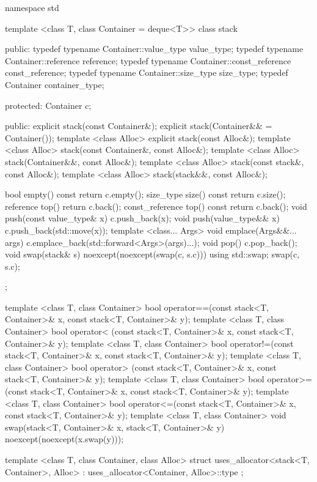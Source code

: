 \begin{codeblock}
namespace std {
  template <class T, class Container = deque<T>>
  class stack {
  public:
    typedef typename Container::value_type            value_type;
    typedef typename Container::reference             reference;
    typedef typename Container::const_reference       const_reference;
    typedef typename Container::size_type             size_type;
    typedef          Container                        container_type;

  protected:
    Container c;

  public:
    explicit stack(const Container&);
    explicit stack(Container&& = Container());
    template <class Alloc> explicit stack(const Alloc&);
    template <class Alloc> stack(const Container&, const Alloc&);
    template <class Alloc> stack(Container&&, const Alloc&);
    template <class Alloc> stack(const stack&, const Alloc&);
    template <class Alloc> stack(stack&&, const Alloc&);

    bool      empty() const             { return c.empty(); }
    size_type size()  const             { return c.size(); }
    reference         top()             { return c.back(); }
    const_reference   top() const       { return c.back(); }
    void push(const value_type& x)      { c.push_back(x); }
    void push(value_type&& x)           { c.push_back(std::move(x)); }
    template <class... Args>
      void emplace(Args&&... args)      { c.emplace_back(std::forward<Args>(args)...); }
    void pop()                          { c.pop_back(); }
    void swap(stack& s) noexcept(noexcept(swap(c, s.c)))
      { using std::swap; swap(c, s.c); }
  };

  template <class T, class Container>
    bool operator==(const stack<T, Container>& x, const stack<T, Container>& y);
  template <class T, class Container>
    bool operator< (const stack<T, Container>& x, const stack<T, Container>& y);
  template <class T, class Container>
    bool operator!=(const stack<T, Container>& x, const stack<T, Container>& y);
  template <class T, class Container>
    bool operator> (const stack<T, Container>& x, const stack<T, Container>& y);
  template <class T, class Container>
    bool operator>=(const stack<T, Container>& x, const stack<T, Container>& y);
  template <class T, class Container>
    bool operator<=(const stack<T, Container>& x, const stack<T, Container>& y);
  template <class T, class Container>
    void swap(stack<T, Container>& x, stack<T, Container>& y) noexcept(noexcept(x.swap(y)));

  template <class T, class Container, class Alloc>
    struct uses_allocator<stack<T, Container>, Alloc>
      : uses_allocator<Container, Alloc>::type { };
}
\end{codeblock}

